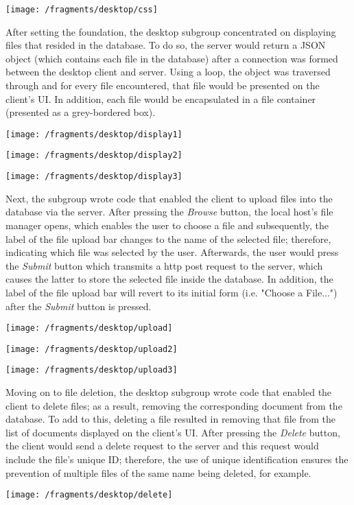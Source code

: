 \documentclass{article}
\begin{document}
\texttt{[image: /fragments/desktop/css]}

After setting the foundation, the desktop subgroup concentrated on displaying files that resided in the database. To do so, the server would return a JSON object (which contains each file in the database) after a connection was formed between the desktop client and server. Using a loop, the object was traversed through and for every file encountered, that file would be presented on the client's UI. In addition, each file would be encapsulated in a file container (presented as a grey-bordered box).

\texttt{[image: /fragments/desktop/display1]}

\texttt{[image: /fragments/desktop/display2]}

\texttt{[image: /fragments/desktop/display3]}

Next, the subgroup wrote code that enabled the client to upload files into the database via the server. After pressing the \textit{Browse} button, the local host's file manager opens, which enables the user to choose a file and subsequently, the label of the file upload bar changes to the name of the selected file; therefore, indicating which file was selected by the user. Afterwards, the user would press the \textit{Submit} button which transmits a http post request to the server, which causes the latter to store the selected file inside the database. In addition, the label of the file upload bar will revert to its initial form (i.e. "Choose a File...") after the \textit{Submit} button is pressed.

\texttt{[image: /fragments/desktop/upload]}

\texttt{[image: /fragments/desktop/upload2]}

\texttt{[image: /fragments/desktop/upload3]}

Moving on to file deletion, the desktop subgroup wrote code that enabled the client to delete files; as a result, removing the corresponding document from the database. To add to this, deleting a file resulted in removing that file from the list of documents displayed on the client's UI. After pressing the \textit{Delete} button, the client would send a delete request to the server and this request would include the file's unique ID; therefore, the use of unique identification ensures the prevention of multiple files of the same name being deleted, for example.

\texttt{[image: /fragments/desktop/delete]}
\end{document}
